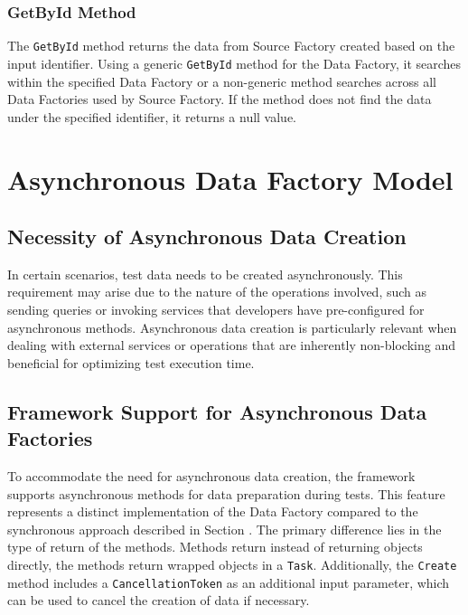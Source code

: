 \subsubsection{GetById Method}\label{subsec:getById}
The \texttt{GetById} method returns the data from Source Factory created based on the input identifier. Using a generic \texttt{GetById} method for the Data Factory, it searches within the specified Data Factory or a non-generic method searches across all Data Factories used by Source Factory. If the method does not find the data under the specified identifier, it returns a null value.

\section{Asynchronous Data Factory Model}

\subsection{Necessity of Asynchronous Data Creation}
In certain scenarios, test data needs to be created asynchronously. This requirement may arise due to the nature of the operations involved, such as sending queries or invoking services that developers have pre-configured for asynchronous methods. Asynchronous data creation is particularly relevant when dealing with external services or operations that are inherently non-blocking and beneficial for optimizing test execution time.

\subsection{Framework Support for Asynchronous Data Factories}
To accommodate the need for asynchronous data creation, the framework supports asynchronous methods for data preparation during tests. This feature represents a distinct implementation of the Data Factory compared to the synchronous approach described in Section . The primary difference lies in the type of return of the methods. Methods return instead of returning objects directly, the methods return wrapped objects in a \texttt{Task}. Additionally, the \texttt{Create} method includes a \texttt{CancellationToken} as an additional input parameter, which can be used to cancel the creation of data if necessary.

